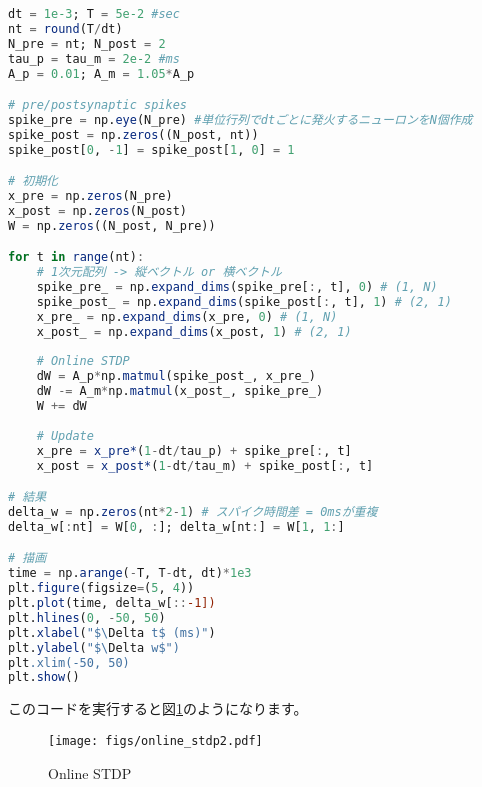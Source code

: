 \begin{lstlisting}[language=julia]
dt = 1e-3; T = 5e-2 #sec
nt = round(T/dt)
N_pre = nt; N_post = 2
tau_p = tau_m = 2e-2 #ms
A_p = 0.01; A_m = 1.05*A_p

# pre/postsynaptic spikes
spike_pre = np.eye(N_pre) #単位行列でdtごとに発火するニューロンをN個作成
spike_post = np.zeros((N_post, nt))
spike_post[0, -1] = spike_post[1, 0] = 1

# 初期化
x_pre = np.zeros(N_pre)
x_post = np.zeros(N_post)
W = np.zeros((N_post, N_pre))

for t in range(nt):
    # 1次元配列 -> 縦ベクトル or 横ベクトル
    spike_pre_ = np.expand_dims(spike_pre[:, t], 0) # (1, N)
    spike_post_ = np.expand_dims(spike_post[:, t], 1) # (2, 1)
    x_pre_ = np.expand_dims(x_pre, 0) # (1, N)
    x_post_ = np.expand_dims(x_post, 1) # (2, 1)
    
    # Online STDP
    dW = A_p*np.matmul(spike_post_, x_pre_)
    dW -= A_m*np.matmul(x_post_, spike_pre_)
    W += dW
    
    # Update
    x_pre = x_pre*(1-dt/tau_p) + spike_pre[:, t]
    x_post = x_post*(1-dt/tau_m) + spike_post[:, t]

# 結果
delta_w = np.zeros(nt*2-1) # スパイク時間差 = 0msが重複
delta_w[:nt] = W[0, :]; delta_w[nt:] = W[1, 1:]

# 描画
time = np.arange(-T, T-dt, dt)*1e3
plt.figure(figsize=(5, 4))
plt.plot(time, delta_w[::-1])
plt.hlines(0, -50, 50)
plt.xlabel("$\Delta t$ (ms)")
plt.ylabel("$\Delta w$")
plt.xlim(-50, 50)
plt.show()
\end{lstlisting}
このコードを実行すると図\ref{fig:online_stdp2}のようになります。
\begin{figure}[htbp]
    \centering
    \texttt{[image: figs/online\_stdp2.pdf]}
    \caption{Online STDP}
    \label{fig:online_stdp2}
\end{figure}
